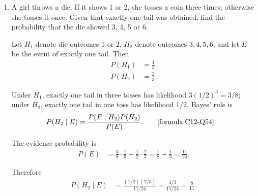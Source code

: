 \begin{enumerate}[label=\thesubsection.\arabic*, ref=\thesubsection.\theenumi]
    The following code generates 10,000 iterations.

\begin{lstlisting}[frame=single, basicstyle=\rmfamily, escapeinside={(*@}{@*)}]
(*@\makebox[\dimexpr\linewidth-2\fboxsep-2\fboxrule\relax][c]{12/codes/Q53/random\_walk.c}@*)
    \end{lstlisting}

    The following code verifies the solution.

    \begin{lstlisting}[frame=single, basicstyle=\rmfamily, escapeinside={(*@}{@*)}]
(*@\makebox[\dimexpr\linewidth-2\fboxsep-2\fboxrule\relax][c]{12/codes/Q53/Q53.py}@*)
    \end{lstlisting}


    \item
    \label{question:C12-Q54}
    \label{question-short:C12-Q54} A girl throws a die. If it shows 1 or 2, she tosses a coin three times; otherwise she tosses it once. Given that exactly one tail was obtained, find the probability that the die showed 3, 4, 5 or 6.

    \par
    \smallskip
    \solution

    Let $H_1$ denote die outcomes $1$ or $2$, $H_2$ denote outcomes $3,4,5,6$, and let $E$ be the event of exactly one tail. Then
    \begin{align*}
        P(H_1) & =\frac13. \\
        P(H_2) & =\frac23.
    \end{align*}

    Under $H_1$, exactly one tail in three tosses has likelihood $3(1/2)^3=3/8$; under $H_2$, exactly one tail in one toss has likelihood $1/2$. Bayes' rule is
    \begin{align*}
        P(H_2\mid E) & =\frac{P(E\mid H_2)P(H_2)}{P(E)}.
	    \tag*{\eqref{formula:C12-Q54}}
    \end{align*}

    \par
    The evidence probability is
    \begin{align*}
        P(E) & =\frac38\cdot\frac13+\frac12\cdot\frac23=\frac18+\frac13=\frac{11}{24}.
    \end{align*}

    Therefore
    \begin{align*}
        P(H_2\mid E) & =\frac{(1/2)(2/3)}{11/24}=\frac{1/3}{11/24}=\frac8{11}.
    \end{align*}


\end{enumerate}
